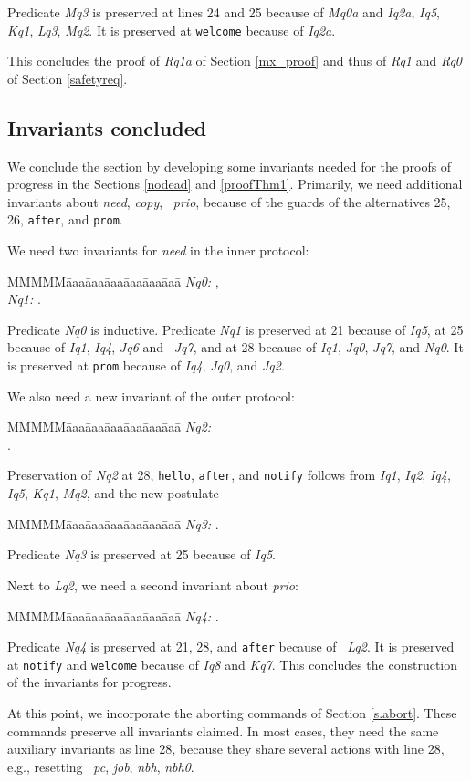 \documentclass[10pt]{article} \usepackage[english]{babel}
\newenvironment{tab}{\begin{tabbing}
MMMMM\=aaa\=aaa\=aaa\=aaa\=aaa\=aaa\= \kill}{\end{tabbing}}
\def\S #1/{\mbox {\textsl{#1}}}
\def\T #1/{\mbox {\texttt{#1}}}
\begin{document}
Predicate \S Mq3/ is preserved at lines 24 and 25 because of \S Mq0a/
and \S Iq2a/, \S Iq5/, \S Kq1/, \S Lq3/, \S Mq2/.  It is preserved at
\T welcome/ because of \S Iq2a/.

This concludes the proof of \S Rq1a/ of Section \ref{mx_proof} and
thus of \S Rq1/ and \S Rq0/ of Section \ref{safetyreq}.

\subsection{Invariants concluded} \label{invarProgress}

We conclude the section by developing some invariants needed for the
proofs of progress in the Sections \ref{nodead} and \ref{proofThm1}.
Primarily, we need additional invariants about \S need/, \S copy/, \S
prio/, because of the guards of the alternatives 25, 26, \T after/,
and \T prom/.

We need two invariants for \S need/ in the inner protocol:
\begin{tab}
\S Nq0:/ \>  ,\\
\S Nq1:/ \>  .
\end{tab}
Predicate \S Nq0/ is inductive.  Predicate \S Nq1/ is preserved at 21
because of \S Iq5/, at 25 because of \S Iq1/, \S Iq4/, \S Jq6/ and \S
Jq7/, and at 28 because of \S Iq1/, \S Jq0/, \S Jq7/, and \S Nq0/.  It
is preserved at \T prom/ because of \S Iq4/, \S Jq0/, and \S Jq2/.

We also need a new invariant of the outer protocol:
\begin{tab}
  \S Nq2:/ \>  \\
  \>  .
\end{tab}
Preservation of \S Nq2/ at 28, \T hello/, \T after/, and \T notify/
follows from \S Iq1/, \S Iq2/, \S Iq4/, \S Iq5/, \S Kq1/, \S Mq2/, and
the new postulate
\begin{tab}
\S Nq3:/ \>  .
\end{tab}
Predicate \S Nq3/ is preserved at 25 because of \S Iq5/. 

Next to \S Lq2/, we need a second invariant about \S prio/:
\begin{tab}
\S Nq4:/ \>  .
\end{tab}
Predicate \S Nq4/ is preserved at 21, 28, and \T after/ because of \S
Lq2/. It is preserved at \T notify/ and \T welcome/ because of \S Iq8/
and \S Kq7/.  This concludes the construction of the invariants for
progress.

At this point, we incorporate the aborting commands of Section
\ref{s.abort}.  These commands preserve all invariants claimed.  In
most cases, they need the same auxiliary invariants as line 28,
because they share several actions with line 28, e.g., resetting \S
pc/, \S job/, \S nbh/, \S nbh0/.
\end{document}
